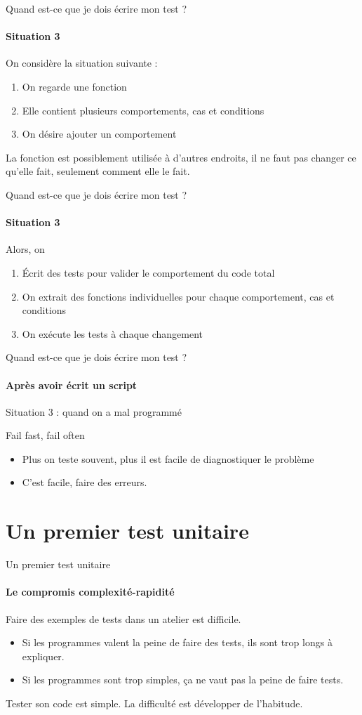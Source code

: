 \documentclass[11pt]{beamer}
\begin{document}
\begin{frame}{Quand est-ce que je dois écrire mon test ?}
\framesubtitle{Situation 3}
On considère la situation suivante :
\begin{enumerate}
\item On regarde une fonction
\item Elle contient plusieurs comportements, cas et conditions
\item On désire ajouter un comportement
\end{enumerate}
La fonction est possiblement utilisée à d'autres endroits, il ne faut pas changer ce qu'elle fait, seulement comment elle le fait.
\end{frame}

\begin{frame}{Quand est-ce que je dois écrire mon test ?}
\framesubtitle{Situation 3}
Alors, on
\begin{enumerate}
\item Écrit des tests pour valider le comportement du code total
\item On extrait des fonctions individuelles pour chaque comportement, cas et conditions
\item On exécute les tests à chaque changement
\end{enumerate}
\end{frame}

\begin{frame}{Quand est-ce que je dois écrire mon test ?}
\framesubtitle{Après avoir écrit un script}
Situation 3 : quand on a mal programmé
\begin{block}{}
Fail fast, fail often
\end{block}
\begin{itemize}
\item Plus on teste souvent, plus il est facile de diagnostiquer le problème
\item C'est facile, faire des erreurs.
\end{itemize}
\end{frame}

\section[Un premier test unitaire]{Un premier test unitaire}

\begin{frame}{Un premier test unitaire}
\framesubtitle{Le compromis complexité-rapidité}
Faire des exemples de tests dans un atelier est difficile.
\begin{itemize}
\item Si les programmes valent la peine de faire des tests, ils sont trop longs à expliquer.
\item Si les programmes sont trop simples, ça ne vaut pas la peine de faire tests.
\end{itemize}

Tester son code est simple. La difficulté est développer de l'habitude.
\end{frame}
\end{document}
